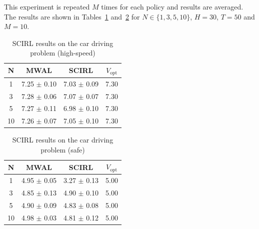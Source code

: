 \documentclass[tablecaption=bottom]{jmlr}
\begin{document}
This experiment is repeated $M$ times for each policy and results
are averaged. The results are shown in
Tables~\ref{table:highway_fast} and~\ref{table:highway_safe}
 for $N \in
\{1, 3, 5, 10\}$, $H = 30$, $T=50$ and $M = 10$.

%

\begin{table}
\begin{center}
    \begin{tabular}{|c|c|c|c|}
    \hline
    N     & MWAL              & SCIRL               & $V_{\text{opt}}$ \\\hline\hline
    1     & 7.25 $\pm$ 0.10   & 7.03 $\pm$ 0.09     & 7.30              \\\hline
    3     & 7.28 $\pm$ 0.06   & 7.07 $\pm$ 0.07     & 7.30              \\\hline
    5     & 7.27 $\pm$ 0.11   & 6.98 $\pm$ 0.10     & 7.30              \\\hline
    10    & 7.26 $\pm$ 0.07   & 7.05 $\pm$ 0.10     & 7.30              \\
    \hline
    \end{tabular}
    \caption{SCIRL results on the car driving
    problem (high-speed)}\label{table:highway_fast}
\end{center}
\end{table}

\begin{table}
\begin{center}
    \begin{tabular}{|c|c|c|c|}
    \hline
    N     & MWAL              & SCIRL               & $V_{\text{opt}}$ \\\hline\hline
    1     & 4.95 $\pm$ 0.05   & 3.27 $\pm$ 0.13     & 5.00              \\\hline
    3     & 4.85 $\pm$ 0.13   & 4.90 $\pm$ 0.10     & 5.00              \\\hline
    5     & 4.90 $\pm$ 0.09   & 4.83 $\pm$ 0.08     & 5.00              \\\hline
    10    & 4.98 $\pm$ 0.03   & 4.81 $\pm$ 0.12     & 5.00              \\
    \hline
    \end{tabular}
    \caption{SCIRL results on the car driving
    problem (safe)}\label{table:highway_safe}
\end{center}
\end{table}
\end{document}

